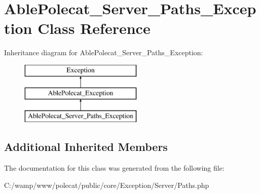\hypertarget{class_able_polecat___server___paths___exception}{}\section{Able\+Polecat\+\_\+\+Server\+\_\+\+Paths\+\_\+\+Exception Class Reference}
\label{class_able_polecat___server___paths___exception}
Inheritance diagram for Able\+Polecat\+\_\+\+Server\+\_\+\+Paths\+\_\+\+Exception\+:\begin{figure}[H]
\begin{center}
\leavevmode
\includegraphics[height=3.000000cm]{class_able_polecat___server___paths___exception}
\end{center}
\end{figure}
\subsection*{Additional Inherited Members}


The documentation for this class was generated from the following file\+:\begin{DoxyCompactItemize}
\item 
C\+:/wamp/www/polecat/public/core/\+Exception/\+Server/Paths.\+php\end{DoxyCompactItemize}
